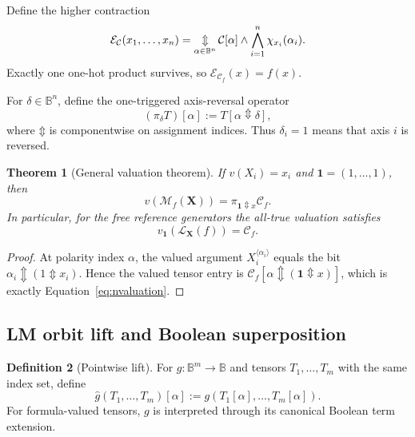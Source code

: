 \documentclass[11pt]{article}
\newtheorem{theorem}{Theorem}[section]
\theoremstyle{definition}
\newtheorem{definition}[theorem]{Definition}
\theoremstyle{remark}
\newcommand{\B}{\mathbb B}
\newcommand{\cC}{\mathcal C}
\newcommand{\cM}{\mathcal M}
\newcommand{\xor}{\mathbin{\Updownarrow}}
\newcommand{\bigxor}{\mathop{\Updownarrow}\displaylimits}
\begin{document}
Define the higher contraction
\begin{equation}
 \mathcal E_{\cC}(x_1,\ldots,x_n)
 =\bigxor_{\alpha\in\B^n}
 \cC[\alpha]\land\bigwedge_{i=1}^n\chi_{x_i}(\alpha_i).
 \label{eq:multiselect}
\end{equation}
Exactly one one-hot product survives, so $\mathcal E_{\cC_f}(x)=f(x)$.

For $\delta\in\B^n$, define the one-triggered axis-reversal operator
\begin{equation}
 (\pi_\delta T)[\alpha]:=T[\alpha\xor\delta],
 \label{eq:piaxis}
\end{equation}
where $\xor$ is componentwise on assignment indices.  Thus $\delta_i=1$ means that axis $i$ is reversed.

\begin{theorem}[General valuation theorem]
If $v(X_i)=x_i$ and $\mathbf1=(1,\ldots,1)$, then
\begin{equation}
 v(\cM_f(\mathbf X))=\pi_{\mathbf1\xor x}\cC_f.
 \label{eq:nvaluation}
\end{equation}
In particular, for the free reference generators the all-true valuation satisfies
\[
 v_{\mathbf1}(\mathcal L_{\mathbf X}(f))=\cC_f.
\]
\end{theorem}
\begin{proof}
At polarity index $\alpha$, the valued argument $X_i^{\langle\alpha_i\rangle}$ equals the bit $\alpha_i\xor(1\xor x_i)$.  Hence the valued tensor entry is $\cC_f[\alpha\xor(\mathbf1\xor x)]$, which is exactly Equation~\eqref{eq:nvaluation}.
\end{proof}

\subsection{LM orbit lift and Boolean superposition}

\begin{definition}[Pointwise lift]
For $g:\B^m\to\B$ and tensors $T_1,\ldots,T_m$ with the same index set, define
\[
 \widehat g(T_1,\ldots,T_m)[\alpha]
 :=g(T_1[\alpha],\ldots,T_m[\alpha]).
\]
For formula-valued tensors, $g$ is interpreted through its canonical Boolean term extension.
\end{definition}
\end{document}
